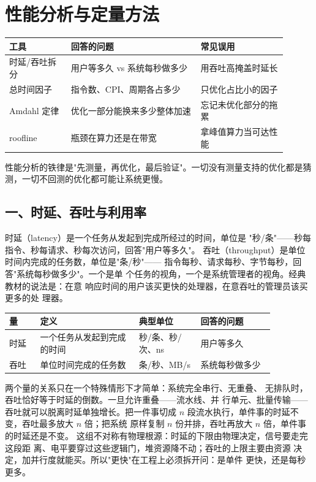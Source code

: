 \chapter{性能分析与定量方法}

\begin{longtable}{L{0.2\linewidth}L{0.42\linewidth}L{0.28\linewidth}}
\toprule
工具 & 回答的问题 & 常见误用 \\
\midrule
时延/吞吐拆分 & 用户等多久 vs 系统每秒做多少 & 用吞吐高掩盖时延长 \\
总时间因子 & 指令数、CPI、周期各占多少 & 只优化占比小的因子 \\
Amdahl 定律 & 优化一部分能换来多少整体加速 & 忘记未优化部分的拖累 \\
roofline & 瓶颈在算力还是在带宽 & 拿峰值算力当可达性能 \\
\bottomrule
\end{longtable}

\begin{keyidea}
性能分析的铁律是"先测量，再优化，最后验证"。一切没有测量支持的优化都是猜测，一切不回测的优化都可能让系统更慢。
\end{keyidea}

\section{一、时延、吞吐与利用率}

时延（latency）是一个任务从发起到完成所经过的时间，单位是
"秒/条"——秒每指令、秒每请求、秒每次访问，回答"用户等多久"。
吞吐（throughput）是单位时间内完成的任务数，单位是"条/秒"——
指令每秒、请求每秒、字节每秒，回答"系统每秒做多少"。一个是单
个任务的视角，一个是系统管理者的视角。经典教材的说法是：在意
响应时间的用户该买更快的处理器，在意吞吐的管理员该买更多的处
理器。

\begin{longtable}{L{0.1\linewidth}L{0.32\linewidth}L{0.2\linewidth}L{0.24\linewidth}}
\toprule
量 & 定义 & 典型单位 & 回答的问题 \\
\midrule
时延 & 一个任务从发起到完成的时间 & 秒/条、秒/次、ns & 用户等多久 \\
吞吐 & 单位时间完成的任务数 & 条/秒、MB/s & 系统每秒做多少 \\
\bottomrule
\end{longtable}

两个量的关系只在一个特殊情形下才简单：系统完全串行、无重叠、
无排队时，吞吐恰好等于时延的倒数。一旦允许重叠——流水线、并
行单元、批量传输——吞吐就可以脱离时延单独增长。把一件事切成
$n$ 段流水执行，单件事的时延不变，吞吐最多放大 $n$ 倍；把系统
原样复制 $n$ 份并排，吞吐再放大 $n$ 倍，单件事的时延还是不变。
这组不对称有物理根源：时延的下限由物理决定，信号要走完这段距
离、电平要穿过这些逻辑门，堆资源降不动；吞吐的上限主要由资源
决定，加并行度就能买。所以"更快"在工程上必须拆开问：是单件
更快，还是每秒更多。


